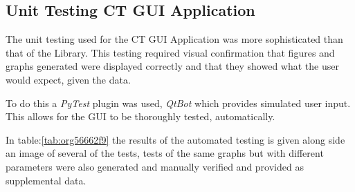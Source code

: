 \documentclass[11pt]{report}
\begin{document}
\clearpage

\subsection{Unit Testing CT GUI Application}
\label{sec:org3690d1e}

The unit testing used for the CT GUI Application was more sophisticated than that of the Library. This testing required visual confirmation that figures and graphs generated were displayed correctly and that they showed what the user would expect, given the data.

To do this a \emph{PyTest} plugin was used, \emph{QtBot} which provides simulated user input. This allows for the GUI to be thoroughly tested, automatically.

In table:\ref{tab:org56662f9} the results of the automated testing is given along side an image of several of the tests, tests of the same graphs but with different parameters were also generated and manually verified and provided as supplemental data.
\end{document}

